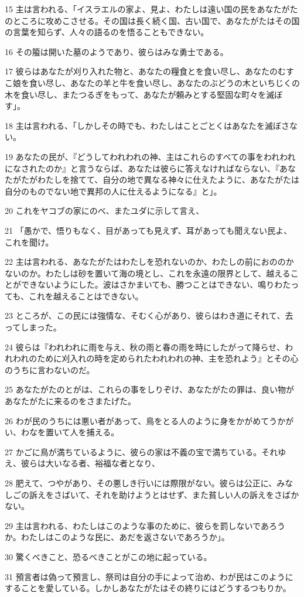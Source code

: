 \par 15 主は言われる、「イスラエルの家よ、見よ、わたしは遠い国の民をあなたがたのところに攻めこさせる。その国は長く続く国、古い国で、あなたがたはその国の言葉を知らず、人々の語るのを悟ることもできない。
\par 16 その箙は開いた墓のようであり、彼らはみな勇士である。
\par 17 彼らはあなたが刈り入れた物と、あなたの糧食とを食い尽し、あなたのむすこ娘を食い尽し、あなたの羊と牛を食い尽し、あなたのぶどうの木といちじくの木を食い尽し、またつるぎをもって、あなたが頼みとする堅固な町々を滅ぼす」。
\par 18 主は言われる、「しかしその時でも、わたしはことごとくはあなたを滅ぼさない。
\par 19 あなたの民が、『どうしてわれわれの神、主はこれらのすべての事をわれわれになされたのか』と言うならば、あなたは彼らに答えなければならない、『あなたがたがわたしを捨てて、自分の地で異なる神々に仕えたように、あなたがたは自分のものでない地で異邦の人に仕えるようになる』と」。
\par 20 これをヤコブの家にのべ、またユダに示して言え、
\par 21 「愚かで、悟りもなく、目があっても見えず、耳があっても聞えない民よ、これを聞け。
\par 22 主は言われる、あなたがたはわたしを恐れないのか、わたしの前におののかないのか。わたしは砂を置いて海の境とし、これを永遠の限界として、越えることができないようにした。波はさかまいても、勝つことはできない、鳴りわたっても、これを越えることはできない。
\par 23 ところが、この民には強情な、そむく心があり、彼らはわき道にそれて、去ってしまった。
\par 24 彼らは『われわれに雨を与え、秋の雨と春の雨を時にしたがって降らせ、われわれのために刈入れの時を定められたわれわれの神、主を恐れよう』とその心のうちに言わないのだ。
\par 25 あなたがたのとがは、これらの事をしりぞけ、あなたがたの罪は、良い物があなたがたに来るのをさまたげた。
\par 26 わが民のうちには悪い者があって、鳥をとる人のように身をかがめてうかがい、わなを置いて人を捕える。
\par 27 かごに鳥が満ちているように、彼らの家は不義の宝で満ちている。それゆえ、彼らは大いなる者、裕福な者となり、
\par 28 肥えて、つやがあり、その悪しき行いには際限がない。彼らは公正に、みなしごの訴えをさばいて、それを助けようとはせず、また貧しい人の訴えをさばかない。
\par 29 主は言われる、わたしはこのような事のために、彼らを罰しないであろうか。わたしはこのような民に、あだを返さないであろうか」。
\par 30 驚くべきこと、恐るべきことがこの地に起っている。
\par 31 預言者は偽って預言し、祭司は自分の手によって治め、わが民はこのようにすることを愛している。しかしあなたがたはその終りにはどうするつもりか。

